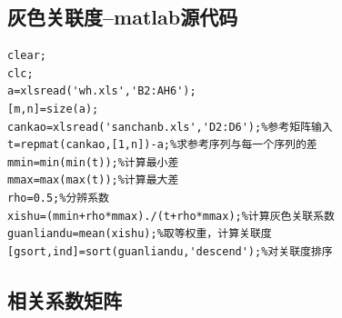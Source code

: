 \documentclass{whutmod}
\begin{document}
\subsection{灰色关联度--matlab源代码}
\begin{lstlisting}
clear;
clc;
a=xlsread('wh.xls','B2:AH6');
[m,n]=size(a);
cankao=xlsread('sanchanb.xls','D2:D6');%参考矩阵输入
t=repmat(cankao,[1,n])-a;%求参考序列与每一个序列的差
mmin=min(min(t));%计算最小差
mmax=max(max(t));%计算最大差
rho=0.5;%分辨系数
xishu=(mmin+rho*mmax)./(t+rho*mmax);%计算灰色关联系数
guanliandu=mean(xishu);%取等权重，计算关联度
[gsort,ind]=sort(guanliandu,'descend');%对关联度排序
\end{lstlisting}
\subsection{相关系数矩阵}
\end{document}
